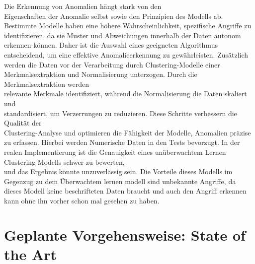 Die Erkennung von Anomalien hängt stark von den \\ Eigenschaften der Anomalie selbst sowie den Prinzipien des Modells ab. \\ Bestimmte Modelle haben eine höhere Wahrscheinlichkeit, spezifische Angriffe zu identifizieren, da sie Muster und Abweichungen innerhalb der Daten autonom erkennen können. Daher ist die Auswahl eines geeigneten Algorithmus entscheidend, um eine effektive Anomalieerkennung zu gewährleisten\cite{Lernen}.
\newpage
Zusätzlich werden die Daten vor der Verarbeitung durch Clustering-Modelle einer \\ Merkmalsextraktion und Normalisierung unterzogen. Durch die Merkmalsextraktion werden \\ relevante Merkmale identifiziert, während die Normalisierung die Daten skaliert und \\ standardisiert, um Verzerrungen zu reduzieren. Diese Schritte verbessern die Qualität der \\ Clustering-Analyse und optimieren die Fähigkeit der Modelle, Anomalien präzise zu erfassen. Hierbei werden Numerische Daten in den Tests bevorzugt. In der realen Implementierung ist die Genauigkeit eines unüberwachtem Lernen Clustering-Modells schwer zu bewerten, \\ und das Ergebnis könnte unzuverlässig sein. Die Vorteile dieses Modells im Gegenzug zu dem Überwachtem lernen modell sind unbekannte Angriffe, da dieses Modell keine beschrifteten Daten braucht und auch den Angriff erkennen kann ohne ihn vorher schon mal gesehen zu haben\cite{OnlyPreprocessing}.  
\newpage

\section{Geplante Vorgehensweise: State of the Art }

